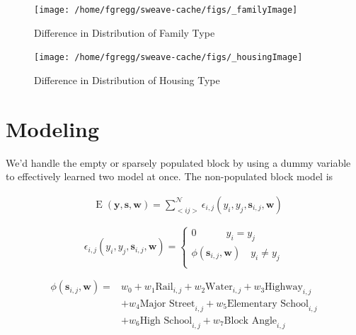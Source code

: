 \documentclass[12pt,letter]{article}\usepackage[]{graphicx}\usepackage[]{color}
\newenvironment{knitrout}{}{} %
\begin{document}
\begin{figure}
\begin{knitrout}
\color{fgcolor}

{\centering \texttt{[image: /home/fgregg/sweave-cache/figs/\_familyImage]} 

}



\end{knitrout}

\caption{Difference in Distribution of Family Type}
\end{figure}


\begin{figure}
\begin{knitrout}
\color{fgcolor}

{\centering \texttt{[image: /home/fgregg/sweave-cache/figs/\_housingImage]} 

}



\end{knitrout}

\caption{Difference in Distribution of Housing Type}
\end{figure}

\section*{Modeling}
We'd handle the empty or sparsely populated block by using a dummy
variable to effectively learned two model at once. The non-populated
block model is 

\begin{align}
&\operatorname{E}(\mathbf{y}, \mathbf{s}, \mathbf{w}) = \sum_{<i
    j>}^{\mathcal{N}}\epsilon_{i,j}(y_i, y_j, \mathbf{s}_{i,j}, \mathbf{w})  
\end{align}

\begin{equation}
\epsilon_{i,j}(y_i, y_j, \mathbf{s}_{i,j}, \mathbf{w}) = \begin{cases}
    0 \quad\quad\quad y_i = y_j \\
    \phi(\mathbf{s}_{i,j}, \mathbf{w}) \quad y_i \neq y_j \\
  \end{cases}
\end{equation}

\begin{align}
\phi(\mathbf{s}_{i,j}, \mathbf{w}) = & w_0 
                                     + w_1\text{Rail}_{i,j} 
                                     + w_2\text{Water}_{i,j} 
                                     + w_3\text{Highway}_{i,j} \\
                                     &+ w_4\text{Major Street}_{i,j} 
                                     + w_5\text{Elementary School}_{i,j}\\ 
                                     & + w_6\text{High School}_{i,j}
                                     + w_7\text{Block Angle}_{i,j} \\
\end{align}
\end{document}

